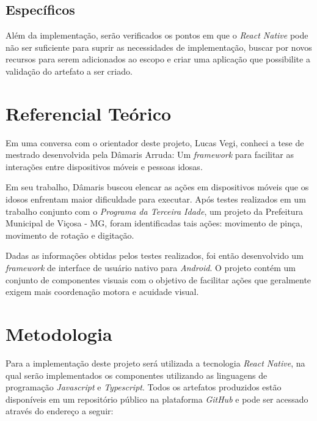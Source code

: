 \documentclass[
	12pt,				    %
	openright,			    %
	oneside,			    %
	a4paper,			    %
    sumario=tradicional,    %
	english,			    %
	brazil,				    %
	]{abntex2}              %
\begin{document}
\section{Específicos}

Além da implementação, serão verificados os pontos em que o \emph{React Native} pode não ser suficiente para suprir as necessidades de implementação, buscar por novos recursos para serem adicionados ao escopo e criar uma aplicação que possibilite a validação do artefato a ser criado.


\chapter{Referencial Teórico}\label{sec:referencialTeorico}

Em uma conversa com o orientador deste projeto, Lucas Vegi, conheci a tese de mestrado desenvolvida pela Dâmaris Arruda: Um \textit{framework} para facilitar as interações entre dispositivos móveis e pessoas idosas\cite{tesedamaris}.

\par

Em seu trabalho, Dâmaris buscou elencar as ações em dispositivos móveis que os idosos enfrentam maior dificuldade para executar. Após testes realizados em um trabalho conjunto com o \emph{Programa da Terceira Idade}, um projeto da Prefeitura Municipal de Viçosa - MG, foram identificadas tais ações: movimento de pinça, movimento de rotação e digitação.

\par

Dadas as informações obtidas pelos testes realizados, foi então desenvolvido um \textit{framework} de interface de usuário nativo para \textit{Android}. O projeto contém um conjunto de componentes visuais com o objetivo de facilitar ações que geralmente exigem mais coordenação motora e acuidade visual.

\chapter{Metodologia}\label{sec:metodologia}

Para a implementação deste projeto será utilizada a tecnologia \emph{React Native}, na qual serão implementados os componentes utilizando as linguagens de programação \emph{Javascript} e \emph{Typescript}. Todos os artefatos produzidos estão disponíveis em um repositório público na plataforma \emph{GitHub} e pode ser acessado através do endereço a seguir: \linebreak
\end{document}
